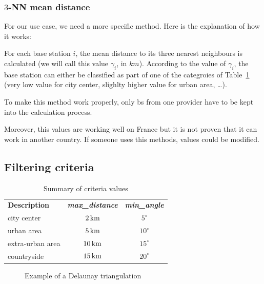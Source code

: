 \documentclass[lettersize,journal,english]{IEEEtran}
\begin{document}
\subsubsection{$3$-NN mean distance}
For our use case, we need a more specific method. Here is the explanation of how it works:

For each base station $i$, the mean distance to its three nearest neighbours is calculated (we will call this value $\gamma_i$, in 
$\unit{km}$). According to the value of $\gamma_i$, the base station can either be classified as part of one of the categroies of 
Table~\ref{table:crit_summary} (very low value for city center, slighlty higher value for urban area, \dots).

To make this method work properly, only \acrshort{bs} from one provider have to be kept into the calculation process.

Moreover, this values are working well on France but it is not proven that it can work in another country. If someone uses this methods, 
values could be modified.

\subsection{Filtering criteria}

\begin{table}[!b]
    \centering
    \caption{Summary of criteria values}
    \label{table:crit_summary}
    \begin{tabular}{lcc}
        \toprule
        \textbf{Description} & \textbf{\emph{max\_distance}} & \textbf{\emph{min\_angle}} \\
        \cmidrule(lr){1-3}
        city center & $\unit[2]{km}$ & $5^\circ$ \\
        urban area & $\unit[5]{km}$ & $10^\circ$ \\
        extra-urban area & $\unit[10]{km}$ & $15^\circ$ \\
        countryside & $\unit[15]{km}$ & $20^\circ$ \\
        \bottomrule
    \end{tabular}
\end{table}

\begin{figure}[!t]
    \centering
    \caption{Example of a Delaunay triangulation}
    \label{fig:crit_pts}
\end{figure}
\end{document}
